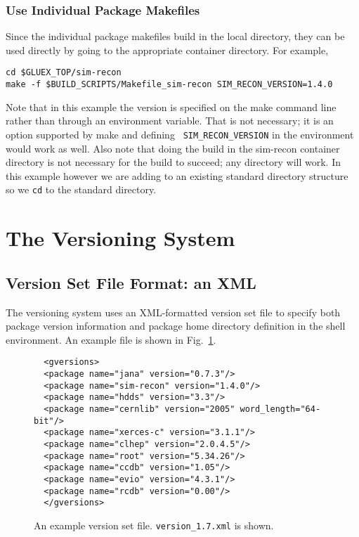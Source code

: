 \documentclass[12pt]{article}
\begin{document}
\subsubsection{Use Individual Package Makefiles}

Since the individual package makefiles build in the local directory,
they can be used directly by going to the appropriate container
directory. For example,
\begin{verbatim}
cd $GLUEX_TOP/sim-recon
make -f $BUILD_SCRIPTS/Makefile_sim-recon SIM_RECON_VERSION=1.4.0
\end{verbatim}
Note that in this example the version is specified on the make command
line rather than through an environment variable. That is not
necessary; it is an option supported by make and defining {\tt
  SIM\_RECON\_VERSION} in the environment would work as well. Also
note that doing the build in the sim-recon container directory is not
necessary for the build to succeed; any directory will work. In this
example however we are adding to an existing standard directory
structure so we {\tt cd} to the standard directory.

\section{The Versioning System}\label{section:versioning}

\subsection{Version Set File Format: an XML}

The versioning system uses an XML-formatted version set file to specify
both package version information and package home directory definition
in the shell environment. An example file is shown in
Fig.~\ref{figure:version-xml}.

\begin{figure}
\begin{verbatim}
  <gversions>
  <package name="jana" version="0.7.3"/>
  <package name="sim-recon" version="1.4.0"/>
  <package name="hdds" version="3.3"/>
  <package name="cernlib" version="2005" word_length="64-bit"/>
  <package name="xerces-c" version="3.1.1"/>
  <package name="clhep" version="2.0.4.5"/>
  <package name="root" version="5.34.26"/>
  <package name="ccdb" version="1.05"/>
  <package name="evio" version="4.3.1"/>
  <package name="rcdb" version="0.00"/>
  </gversions>
\end{verbatim}
\caption{An example version set file. {\tt version\_1.7.xml} is shown.}\label{figure:version-xml}
\end{figure}
\end{document}
